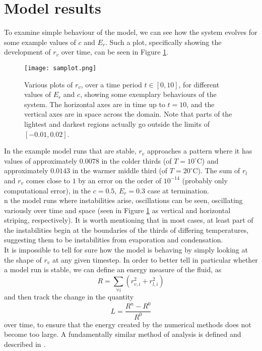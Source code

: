 \documentclass[11pt]{article}
\begin{document}
\section{Model results}
To examine simple behaviour of the model, we can see how the system evolves for some example values of $c$ and $E_r$. Such a plot, specifically showing the development of $r_v$ over time, can be seen in Figure \ref{fig:samplot}.
\begin{figure}[H]
\centering
\texttt{[image: samplot.png]}
\caption{Various plots of $r_v$, over a time period $t\in[0,10]$, for different values of $E_r$ and $c$, showing some exemplary behaviours of the system. The horizontal axes are in time up to $t=10$, and the vertical axes are in space across the domain. Note that parts of the lightest and darkest regions actually go outside the limits of $[-0.01,0.02]$.}
\label{fig:samplot}
\end{figure}
In the example model runs that are stable, $r_v$ approaches a pattern where it has values of approximately $0.0078$ in the colder thirds (of $T=10^{\circ}$C) and approximately $0.0143$ in the warmer middle third (of $T=20^{\circ}$C). The sum of $r_l$ and $r_v$ comes close to $1$ by an error on the order of $10^{-14}$ (probably only computational error), in the $c=0.5$, $E_r=0.3$ case at termination. \\
n the model runs where instabilities arise, oscillations can be seen, oscillating variously over time and space (seen in Figure \ref{fig:samplot} as vertical and horizontal striping, respectively). It is worth mentioning that in most cases, at least part of the instabilities begin at the boundaries of the thirds of differing temperatures, suggesting them to be instabilities from evaporation and condensation. \\
It is impossible to tell for sure how the model is behaving by simply looking at the shape of $r_v$ at any given timestep. In order to better tell in particular whether a model run is stable, we can define an energy measure of the fluid, as
\begin{equation} \label{eq:re_def}
R = \sum_{\forall i}\left(r_{v,i}^2+r_{l,i}^2\right)
\end{equation}
and then track the change in the quantity
\begin{equation} \label{eq:le_def}
L = \frac{R^n - R^0}{R^0}
\end{equation}
over time, to ensure that the energy created by the numerical methods does not become too large. A fundamentally similar method of analysis is defined and described in \citet[p.~94]{Durran2010}. \\
\end{document}
